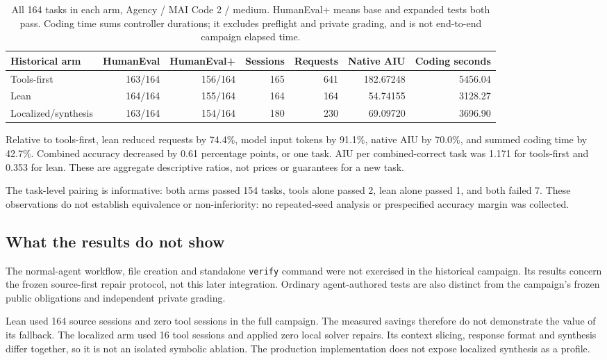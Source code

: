 \documentclass[10pt,twocolumn,a4paper]{article}
\begin{document}
\begin{table}[t]
\centering\small
\begin{tabular}{lrrrrrr}
\toprule
Historical arm & HumanEval & HumanEval+ & Sessions & Requests & Native AIU & Coding seconds\\
\midrule
Tools-first & 163/164 & 156/164 & 165 & 641 & 182.67248 & 5456.04 \\
Lean & 164/164 & 155/164 & 164 & 164 & 54.74155 & 3128.27 \\
Localized/synthesis & 163/164 & 154/164 & 180 & 230 & 69.09720 & 3696.90 \\
\bottomrule
\end{tabular}
\caption{All 164 tasks in each arm, Agency / MAI Code 2 / medium.
HumanEval+ means base and expanded tests both pass.
Coding time sums controller durations; it excludes preflight and private
grading, and is not end-to-end campaign elapsed time.}
\label{tab:results}
\end{table}

Relative to tools-first, lean reduced requests by 74.4\%,
model input tokens by 91.1\%, native AIU by 70.0\%,
and summed coding time by 42.7\%. Combined accuracy decreased
by 0.61 percentage points, or one task.
AIU per combined-correct task was 1.171 for tools-first
and 0.353 for lean. These are aggregate descriptive ratios,
not prices or guarantees for a new task.

The task-level pairing is informative: both arms passed 154 tasks,
tools alone passed 2, lean alone passed 1, and both
failed 7. These observations do not establish equivalence or
non-inferiority: no repeated-seed analysis or prespecified accuracy margin
was collected.

\subsection{What the results do not show}
The normal-agent workflow, file creation and standalone \texttt{verify}
command were not exercised in the historical campaign. Its results concern
the frozen source-first repair protocol, not this later integration.
Ordinary agent-authored tests are also distinct from the campaign's frozen
public obligations and independent private grading.

Lean used 164 source sessions and zero tool sessions in the full campaign.
The measured savings therefore do not demonstrate the value of its fallback.
The localized arm used 16 tool sessions and applied zero local solver repairs.
Its context slicing, response format and synthesis differ together, so it is
not an isolated symbolic ablation. The production implementation does not
expose localized synthesis as a profile.
\end{document}
